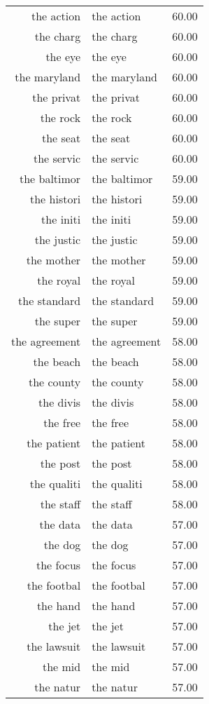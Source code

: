 \begin{table}[ht]
\begin{tabular}{rlr}
  the action & the action & 60.00 \\ 
  the charg & the charg & 60.00 \\ 
  the eye & the eye & 60.00 \\ 
  the maryland & the maryland & 60.00 \\ 
  the privat & the privat & 60.00 \\ 
  the rock & the rock & 60.00 \\ 
  the seat & the seat & 60.00 \\ 
  the servic & the servic & 60.00 \\ 
  the baltimor & the baltimor & 59.00 \\ 
  the histori & the histori & 59.00 \\ 
  the initi & the initi & 59.00 \\ 
  the justic & the justic & 59.00 \\ 
  the mother & the mother & 59.00 \\ 
  the royal & the royal & 59.00 \\ 
  the standard & the standard & 59.00 \\ 
  the super & the super & 59.00 \\ 
  the agreement & the agreement & 58.00 \\ 
  the beach & the beach & 58.00 \\ 
  the county & the county & 58.00 \\ 
  the divis & the divis & 58.00 \\ 
  the free & the free & 58.00 \\ 
  the patient & the patient & 58.00 \\ 
  the post & the post & 58.00 \\ 
  the qualiti & the qualiti & 58.00 \\ 
  the staff & the staff & 58.00 \\ 
  the data & the data & 57.00 \\ 
  the dog & the dog & 57.00 \\ 
  the focus & the focus & 57.00 \\ 
  the footbal & the footbal & 57.00 \\ 
  the hand & the hand & 57.00 \\ 
  the jet & the jet & 57.00 \\ 
  the lawsuit & the lawsuit & 57.00 \\ 
  the mid & the mid & 57.00 \\ 
  the natur & the natur & 57.00 \\ 

\end{tabular}
\end{table}
